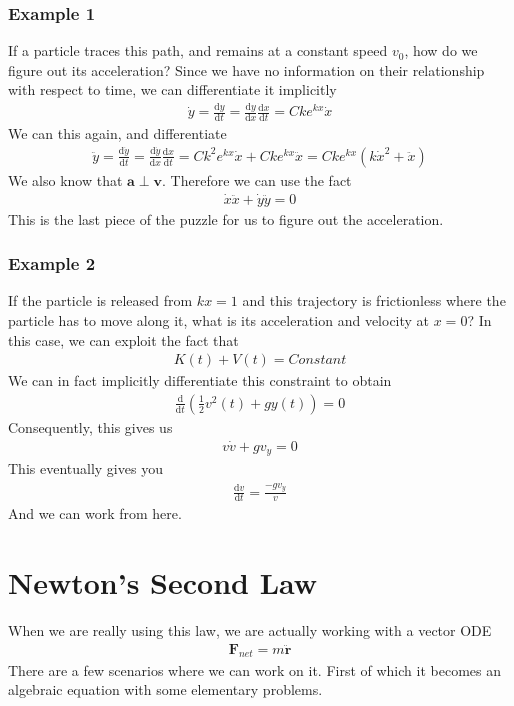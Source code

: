 \documentclass[12pt]{article}
\newcommand{\dydx}[2]{\frac{\text{d} #1}{\text{d} #2}}
\newcommand{\paren}[1]{\left( #1 \right)}
\begin{document}
    \subsubsection{Example 1}
    If a particle traces this path, and remains at a constant speed $v_0$, how do we figure out its acceleration? Since we have no information on their relationship with respect to time, we can differentiate it implicitly
    \begin{align}
    \dot{y} = \dydx{y}{t} = \dydx{y}{x}\dydx{x}{t} = Cke^{kx}\dot{x}
    \end{align}
    We can this again, and differentiate
    \begin{align}
    \ddot{y} = \dydx{\dot{y}}{t} = \dydx{\dot{y}}{x}\dydx{x}{t} = Ck^2e^{kx}\dot{x} + Cke^{kx}\ddot{x} = Cke^{kx}\paren{k\dot{x}^2+\ddot{x}}
    \end{align}
    We also know that $\mathbf{a}\perp\mathbf{v}$. Therefore we can use the fact 
    \begin{align}
    \dot{x}\ddot{x}+\dot{y}\ddot{y} = 0
    \end{align}
    This is the last piece of the puzzle for us to figure out the acceleration. 
    \subsubsection{Example 2}
    If the particle is released from $kx=1$ and this trajectory is frictionless where the particle has to move along it, what is its acceleration and velocity at $x=0$? In this case, we can exploit the fact that
    \begin{align}
    K(t) + V(t) = \textit{Constant}
    \end{align}
    We can in fact implicitly differentiate this constraint to obtain
    \begin{align}
    \dydx{}{t}\paren{ \frac{1}{2}v^2(t) + gy(t)} = 0
    \end{align}
    Consequently, this gives us
    \begin{align}
    v\dot{v} + gv_y = 0
    \end{align}
    This eventually gives you
    \begin{align}
    \dydx{v}{t} = \frac{-g v_y}{v}
    \end{align}
    And we can work from here.




\section{Newton's Second Law}
    When we are really using this law, we are actually working with a vector ODE
    \begin{align}
    \mathbf{F}_{net} = m\ddot{\mathbf{r}}
    \end{align}
    There are a few scenarios where we can work on it. First of which it becomes an algebraic equation with some elementary problems.
\end{document}

